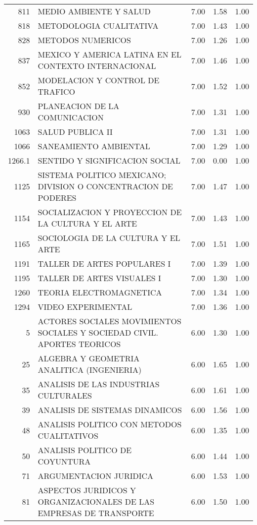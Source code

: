 \documentclass[12pt]{article}
\begin{document}
\begin{table}[ht]
\begin{tabular}{rlrrr}
  811 & MEDIO AMBIENTE Y SALUD & 7.00 & 1.58 & 1.00 \\ 
  818 & METODOLOGIA CUALITATIVA & 7.00 & 1.43 & 1.00 \\ 
  828 & METODOS NUMERICOS & 7.00 & 1.26 & 1.00 \\ 
  837 & MEXICO Y AMERICA LATINA EN EL CONTEXTO INTERNACIONAL & 7.00 & 1.46 & 1.00 \\ 
  852 & MODELACION Y CONTROL DE TRAFICO & 7.00 & 1.52 & 1.00 \\ 
  930 & PLANEACION DE LA COMUNICACION & 7.00 & 1.31 & 1.00 \\ 
  1063 & SALUD PUBLICA II & 7.00 & 1.31 & 1.00 \\ 
  1066 & SANEAMIENTO AMBIENTAL & 7.00 & 1.29 & 1.00 \\ 
  1266.1 & SENTIDO Y SIGNIFICACION SOCIAL & 7.00 & 0.00 & 1.00 \\ 
  1125 & SISTEMA POLITICO MEXICANO; DIVISION O CONCENTRACION DE PODERES & 7.00 & 1.47 & 1.00 \\ 
  1154 & SOCIALIZACION Y PROYECCION DE LA CULTURA Y EL ARTE & 7.00 & 1.43 & 1.00 \\ 
  1165 & SOCIOLOGIA DE LA CULTURA Y EL ARTE & 7.00 & 1.51 & 1.00 \\ 
  1191 & TALLER DE ARTES POPULARES I & 7.00 & 1.39 & 1.00 \\ 
  1195 & TALLER DE ARTES VISUALES I & 7.00 & 1.30 & 1.00 \\ 
  1260 & TEORIA ELECTROMAGNETICA & 7.00 & 1.34 & 1.00 \\ 
  1294 & VIDEO EXPERIMENTAL & 7.00 & 1.36 & 1.00 \\ 
  5 & ACTORES SOCIALES MOVIMIENTOS SOCIALES Y SOCIEDAD CIVIL. APORTES TEORICOS & 6.00 & 1.30 & 1.00 \\ 
  25 & ALGEBRA Y GEOMETRIA ANALITICA (INGENIERIA) & 6.00 & 1.65 & 1.00 \\ 
  35 & ANALISIS DE LAS INDUSTRIAS CULTURALES & 6.00 & 1.61 & 1.00 \\ 
  39 & ANALISIS DE SISTEMAS DINAMICOS & 6.00 & 1.56 & 1.00 \\ 
  48 & ANALISIS POLITICO CON METODOS CUALITATIVOS & 6.00 & 1.35 & 1.00 \\ 
  50 & ANALISIS POLITICO DE COYUNTURA & 6.00 & 1.44 & 1.00 \\ 
  71 & ARGUMENTACION JURIDICA & 6.00 & 1.53 & 1.00 \\ 
  81 & ASPECTOS JURIDICOS Y ORGANIZACIONALES DE LAS EMPRESAS DE TRANSPORTE & 6.00 & 1.50 & 1.00 \\ 

\end{tabular}
\end{table}
\end{document}
